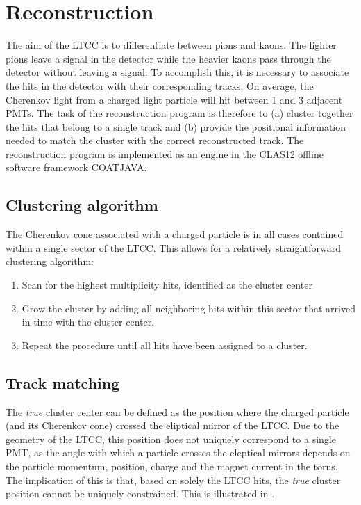 \section{Reconstruction}

The aim of the LTCC is to differentiate between pions and kaons. The lighter pions
leave a signal in the detector while the heavier kaons pass through the detector without
leaving a signal.
To accomplish this, it is necessary to associate the hits in the detector with their
corresponding tracks.
On average, the Cherenkov light from a charged light particle will hit between 1 and 3
adjacent PMTs.
The task of the reconstruction program is therefore to (a) cluster together the hits that
belong to a single track and (b) provide the positional information needed to match the
cluster with the correct reconstructed track.
The reconstruction program is implemented as an engine in the CLAS12 offline software
framework COATJAVA.

\subsection{Clustering algorithm}
The Cherenkov cone associated with a charged particle is in all cases contained within a
single sector of the LTCC. This allows for a relatively straightforward clustering
algorithm:
\begin{enumerate}
    \item Scan for the highest multiplicity hits, identified as the cluster center
    \item Grow the cluster by adding all neighboring hits within this sector that arrived
      in-time with the cluster center.
    \item Repeat the procedure until all hits have been assigned to a cluster.
\end{enumerate}

\subsection{Track matching}

The \textit{true} cluster center can be defined as the position where the charged particle
(and its Cherenkov cone) crossed the eliptical mirror of the LTCC.
Due to the geometry of the LTCC, this position does not uniquely correspond to a single
PMT, as the angle with which a particle crosses the eleptical mirrors depends on the
particle momentum, position, charge and the magnet current in the torus.
The implication of this is that, based on solely the LTCC hits, the \textit{true} cluster
position cannot be uniquely constrained.
This is illustrated in .

